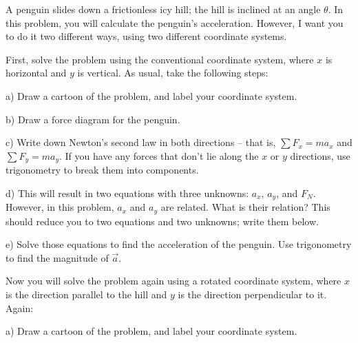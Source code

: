\documentclass[12pt]{article}
\begin{document}
\Large
\centerline{}
\normalsize
\centerline{}

A penguin slides down a frictionless icy hill; the hill is inclined at an angle $\theta$. In this problem, you will 
calculate the penguin's acceleration. However, I want you to do it two different ways, using two different coordinate systems.

First, solve the problem using the conventional coordinate system, where $x$ is horizontal and $y$ is vertical. As usual, take the following steps:

\bigskip

\begin{minipage}{0.5\textwidth}
\begin{center}a) Draw a cartoon of the problem, and label your coordinate system.
\end{center}
\end{minipage}
\begin{minipage}{0.5\textwidth}
	\begin{center}
	b) Draw a force diagram for the penguin. 
	\end{center}

\end{minipage}
\vspace{2in}




c) Write down Newton's second law in both directions -- that is, $\sum F_x = ma_x$ and $\sum F_y = ma_y$. If you have any forces that don't lie along the $x$ or $y$ directions, use trigonometry to break them into components.

\vspace{2in}
\newpage
d) This will result in two equations with three unknowns: $a_x$, $a_y$, and $F_N$. However, in this problem, $a_x$ and $a_y$ are related. What is their relation? This should reduce you to two equations and two unknowns; write them below.
\vspace{3in}

e) Solve those equations to find the acceleration of the penguin. Use trigonometry to find the magnitude of $\vec a$.

\newpage
Now you will solve the problem again using a rotated coordinate system, where $x$ is the direction parallel to the hill and $y$ is the direction perpendicular to it. Again:

a) Draw a cartoon of the problem, and label your coordinate system. 

\vspace{2.5in}
\end{document}
